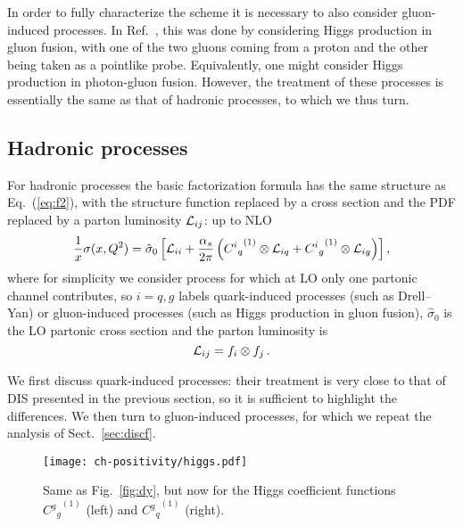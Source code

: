 In order to fully characterize the scheme it is necessary to also
consider gluon-induced processes. In Ref.~\cite{Altarelli:1998gn},
this was done by considering Higgs production in gluon fusion, with
one of the two gluons coming from a proton and the other being taken
as a pointlike probe. Equivalently, one might consider Higgs production in
photon-gluon fusion. However, the treatment of these
processes is essentially the same as that of hadronic processes, to
which we thus turn.


\subsection{Hadronic processes}
\label{sec:hadr}
For hadronic processes the basic factorization formula has the same structure
as Eq.~(\ref{eq:f2}), with the structure function replaced by a cross section
and the PDF replaced by a parton luminosity ${\cal L}_{ij}$: up to NLO
\begin{equation}
 \frac{1}{x} \sigma(x,Q^2)= \hat \sigma_0 \left[  {\cal L}_{ii}
   +\frac{\alpha_s}{2\pi}\left( {{C^i}_q}^{(1)} \otimes {\cal L}_{iq} +
 {{C^i}_g}^{(1)} \otimes {\cal L}_{ig}\right) \right],\label{eq:hadfact}
\end{equation}
where for simplicity we consider process for which at LO only one
partonic channel contributes, so
$i=q,g$ labels quark-induced processes (such as Drell--Yan) or
gluon-induced processes (such as Higgs production in gluon fusion),
$\hat{\sigma}_0$ is the LO partonic cross section and
the parton luminosity is 
\begin{equation}\label{eq:lumi}
 {\cal L}_{ij}= f_i\otimes f_j\,.
\end{equation}

We first discuss quark-induced processes: their treatment is very close to that
of DIS  presented in the previous section, so it is sufficient to highlight the
differences.
We then turn to gluon-induced processes, for which we repeat the analysis of
Sect.~\ref{sec:discf}.


\begin{figure}[t]
  \begin{center}
    \texttt{[image: ch-positivity/higgs.pdf]}
    \caption{\small Same as Fig.~\ref{fig:dy}, but now for the Higgs
      coefficient functions  ${{{C^g}_g}^{(1)}}$ (left) and
      ${{{C^g}_q}^{(1)}}$ (right).
    \label{fig:higgs} }
  \end{center}
\end{figure}


